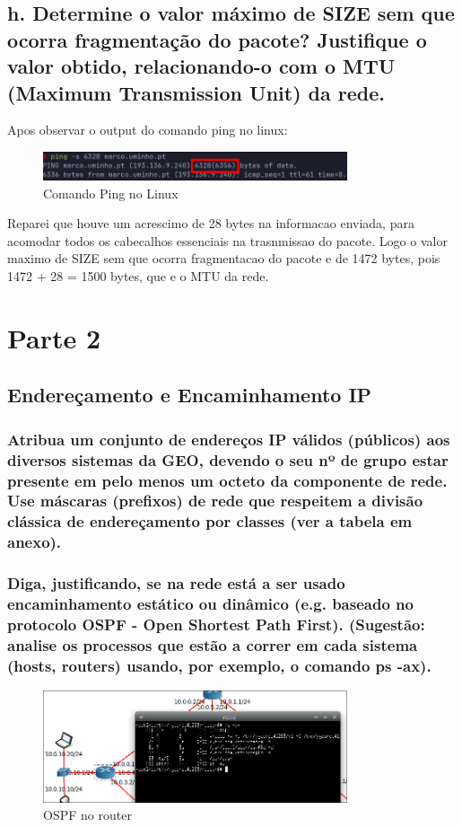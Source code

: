\documentclass{article}
\begin{document}
\subsection*{h. Determine o valor máximo de SIZE sem que ocorra
fragmentação do pacote? Justifique o valor obtido, relacionando-o com o
MTU (Maximum Transmission Unit) da rede.}

Apos observar o output do comando ping no linux:
\begin{figure}[h]
    \centering
    \includegraphics[width=0.8\textwidth]{images/ping_cmd.png}
    \caption{\label{fig:ping_cmd}Comando Ping no Linux}
\end{figure}
Reparei que houve um acrescimo de 28 bytes na informacao enviada, para acomodar todos os cabecalhos essenciais na trasnmissao do pacote.
Logo o valor maximo de SIZE sem que ocorra fragmentacao do pacote e de 1472 bytes, pois 1472 + 28 = 1500 bytes, que e o MTU da rede.

\section{Parte 2}
\subsection{Endereçamento e Encaminhamento IP}
\subsubsection{Atribua um conjunto de endereços IP válidos (públicos) aos diversos sistemas da
GEO, devendo o seu nº de grupo estar presente em pelo menos um octeto da
componente de rede. Use máscaras (prefixos) de rede que respeitem a divisão
clássica de endereçamento por classes (ver a tabela em anexo).}

\subsubsection{Diga, justificando, se na rede está a ser usado encaminhamento estático ou
dinâmico (e.g. baseado no protocolo OSPF - Open Shortest Path First). (Sugestão:
analise os processos que estão a correr em cada sistema (hosts, routers) usando,
por exemplo, o comando ps -ax).}

\begin{figure}[h]
    \centering
    \includegraphics[width=0.8\textwidth]{images/ospf.png}
    \caption{\label{fig:ospf}OSPF no router}
\end{figure}
\end{document}
